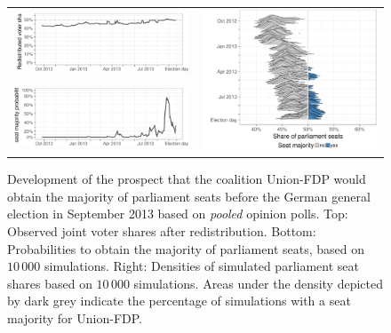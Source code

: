 \documentclass[smallcondensed]{svjour3}     %
\begin{document}
\begin{figure}[H]\centering
\begin{tabular}{ll}
\includegraphics[height=.15\textwidth]{figures/2013_pooled_cdufdp_rawSharesRedist.pdf}
&
\multirow{2}{*}[13ex]{\includegraphics[height=.3\textwidth]{figures/2013_pooled_cdufdp_ridgeline.pdf}}
\\
\includegraphics[height=.15\textwidth]{figures/2013_pooled_cdufdp_prob.pdf}
\end{tabular}
\caption{Development of the prospect that the coalition Union-FDP would obtain
the majority of parliament seats before the German general election in September
2013 based on \emph{pooled} opinion polls. Top: Observed joint voter shares after
redistribution. Bottom: Probabilities to obtain the majority of parliament seats,
based on $10\,000$ simulations.
Right: Densities of simulated parliament seat shares based on $10\,000$ simulations.
Areas under the density depicted by dark grey indicate the percentage of
simulations with a seat majority for Union-FDP.
\label{fig:2013_cdufdp}
}
\end{figure}
\end{document}
